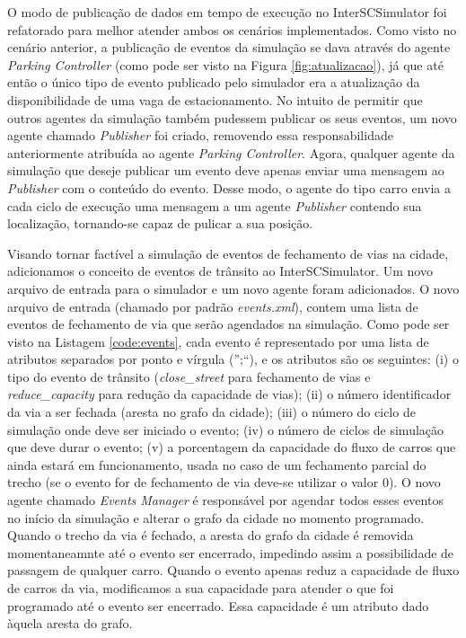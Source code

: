 O modo de publicação de dados em tempo de execução no InterSCSimulator foi refatorado para melhor atender ambos os cenários implementados.
Como visto no cenário anterior, a publicação de eventos da simulação se dava através do agente \textit{Parking Controller} (como pode ser visto na Figura \ref{fig:atualizacao}), já que
até então o único tipo de evento publicado pelo simulador era a atualização da disponibilidade de uma vaga de estacionamento.
No intuito de permitir que outros agentes da simulação também pudessem publicar os seus eventos, um novo agente chamado \textit{Publisher} foi criado, removendo essa responsabilidade
anteriormente atribuída ao agente \textit{Parking Controller}.
Agora, qualquer agente da simulação que deseje publicar um evento deve apenas enviar uma mensagem ao \textit{Publisher} com o conteúdo do evento.
Desse modo, o agente do tipo carro envia a cada ciclo de execução uma mensagem a um agente \textit{Publisher} contendo sua localização, tornando-se capaz de pulicar a sua posição.

Visando tornar factível a simulação de eventos de fechamento de vias na cidade, adicionamos o conceito de eventos de trânsito ao InterSCSimulator.
Um novo arquivo de entrada para o simulador e um novo agente foram adicionados.
O novo arquivo de entrada (chamado por padrão \textit{events.xml}), contem uma lista de eventos de fechamento de via que serão agendados na simulação.
Como pode ser visto na Listagem \ref{code:events}, cada evento é representado por uma lista de atributos separados por ponto e vírgula ('';``), e os atributos são os seguintes:
(i) o tipo do evento de trânsito (\textit{close\_street} para fechamento de vias e \textit{reduce\_capacity} para redução da capacidade de vias);
(ii) o número identificador da via a ser fechada (aresta no grafo da cidade);
(iii) o número do ciclo de simulação onde deve ser iniciado o evento;
(iv) o número de ciclos de simulação que deve durar o evento;
(v) a porcentagem da capacidade do fluxo de carros que ainda estará em funcionamento, usada no caso de um fechamento parcial do trecho (se o evento for de fechamento de via deve-se utilizar o valor 0).
O novo agente chamado \textit{Events Manager} é responsável por agendar todos esses eventos no início da simulação e alterar o grafo da cidade no momento programado.
Quando o trecho da via é fechado, a aresta do grafo da cidade é removida momentaneamnte até o evento ser encerrado, impedindo assim a possibilidade de passagem de qualquer
carro.
Quando o evento apenas reduz a capacidade de fluxo de carros da via, modificamos a sua capacidade para atender o que foi programado até o evento ser encerrado.
Essa capacidade é um atributo dado àquela aresta do grafo.

